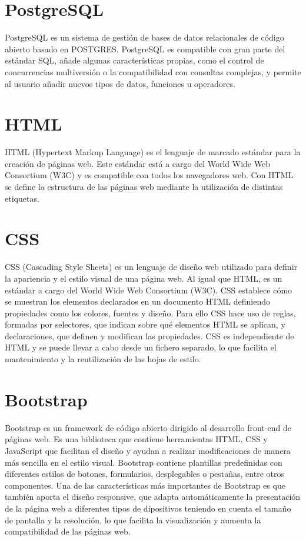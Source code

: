 \documentclass[a4paper, 12pt]{book}
\begin{document}
\section{PostgreSQL} 
\label{sec:postgresql}

PostgreSQL\cite{postgresql} es un sistema de gestión de bases de datos relacionales de código abierto basado en POSTGRES. PostgreSQL es compatible con gran parte del estándar SQL, añade algunas características propias, como el control de concurrencias multiversión o la compatibilidad con consultas complejas, y permite al usuario añadir nuevos tipos de datos, funciones u operadores.

\section{HTML} 
\label{sec:html}

HTML (Hypertext Markup Language)\cite{htmlcss} es el lenguaje de marcado estándar para la creación de páginas web. Este estándar está a cargo del World Wide Web Consortium (W3C) y es compatible con todos los navegadores web.
Con HTML se define la estructura de las páginas web mediante la utilización de distintas etiquetas.

\section{CSS} 
\label{sec:css}

CSS (Cascading Style Sheets)\cite{htmlcss} es un lenguaje de diseño web utilizado para definir la apariencia y el estilo visual de una página web. Al igual que HTML, es un estándar a cargo del World Wide Web Consortium (W3C).
CSS establece cómo se muestran los elementos declarados en un documento HTML definiendo propiedades como los colores, fuentes y diseño. Para ello CSS hace uso de reglas, formadas por selectores, que indican sobre qué elementos HTML se aplican, y declaraciones, que definen y modifican las propiedades.
CSS es independiente de HTML y se puede llevar a cabo desde un fichero separado, lo que facilita el mantenimiento y la reutilización de las hojas de estilo.


\section{Bootstrap} 
\label{sec:bootstrap}

Bootstrap\cite{bootstrap} es un framework de código abierto dirigido al desarrollo front-end de páginas web. Es una biblioteca que contiene herramientas HTML, CSS y JavaScript que facilitan el diseño y ayudan a realizar modificaciones de manera más sencilla en el estilo visual. Bootstrap contiene plantillas predefinidas con diferentes estilos de botones, formularios, desplegables o pestañas, entre otros componentes. Una de las características más importantes de Bootstrap es que también aporta el diseño responsive, que adapta automáticamente la presentación de la página web a diferentes tipos de dipositivos teniendo en cuenta el tamaño de pantalla y la resolución, lo que facilita la visualización y aumenta la compatibilidad de las páginas web.
\end{document}
